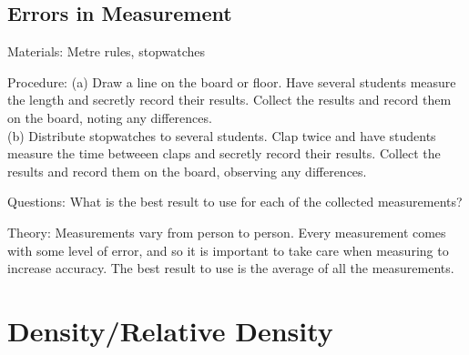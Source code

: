 \begin{multicols}{2}
\columnbreak

\subsection{Errors in Measurement}
\label{sub:meas-errors}

\begin{description*}
\item[Materials:]{Metre rules, stopwatches}
\item[Procedure:]{(a) Draw a line on the board or floor. Have several students measure the length and secretly record their results. Collect the results and record them on the board, noting any differences.\\(b) Distribute stopwatches to several students. Clap twice and have students measure the time betweeen claps and secretly record their results. Collect the results and record them on the board, observing any differences.}
\item[Questions:]{What is the best result to use for each of the collected measurements?}
\item[Theory:]{Measurements vary from person to person. Every measurement comes with some level of error, and so it is important to take care when measuring to increase accuracy. The best result to use is the average of all the measurements.}
\end{description*}


\section*{Density/Relative Density}




\end{multicols}
